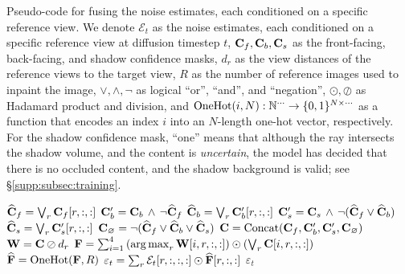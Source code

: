 \begin{algorithm*}
\caption{Pseudo-code for fusing the noise estimates, each conditioned on a specific reference view. We denote $\mathcal{E}_t$ as the noise estimates, each conditioned on a specific reference view at diffusion timestep $t$, $\mathbf{C}_f, \mathbf{C}_b, \mathbf{C}_s$ as the front-facing, back-facing, and shadow confidence masks, $d_r$ as the view distances of the reference views to the target view, $R$ as the number of reference images used to inpaint the image, $\lor, \land, \neg$ as logical ``or'', ``and'', and ``negation'', $\odot, \oslash$ as Hadamard product and division, and $\operatorname{OneHot}(i, N): \mathbb{N}^{\cdots} \to \{0, 1\}^{N \times \cdots}$ as a function that encodes an index $i$ into an $N$-length one-hot vector, respectively. For the shadow confidence mask, ``one'' means that although the ray intersects the shadow volume, and the content is \textit{uncertain}, the model has decided that there is no occluded content, and the shadow background is valid; see \S\ref{supp:subsec:training}. }
\begin{algorithmic}[1]
    \State $\widehat{\mathbf{C}}_f = \bigvee_r \mathbf{C}_f[r, :, :]$
    \State $\mathbf{C}'_b = \mathbf{C}_b \, \land \, \neg \widehat{\mathbf{C}}_f$
    \State $\widehat{\mathbf{C}}_b = \bigvee_r \mathbf{C}'_b[r, :, :]$
    \State $\mathbf{C}'_s = \mathbf{C}_s \, \land \, \neg (\widehat{\mathbf{C}}_f \lor \widehat{\mathbf{C}}_b)$
    \State $\widehat{\mathbf{C}}_s = \bigvee_r \mathbf{C}'_s[r, :, :]$
    \State $\mathbf{C}_\varnothing = \neg (\widehat{\mathbf{C}}_f \lor \widehat{\mathbf{C}}_b \lor \widehat{\mathbf{C}}_s)$
    \State $\mathbf{C} = \operatorname{Concat}(\mathbf{C}_f, \mathbf{C}'_b, \mathbf{C}'_s, \mathbf{C}_\varnothing)$
    \State $\mathbf{W} = \mathbf{C} \oslash d_r$
    \State $\mathbf{F} = \sum_{i=1}^4 \left(
        \operatorname*{arg\,max}_r \mathbf{W}[i, r, :, :]
    \right) \odot \left(
        \bigvee_r \mathbf{C}[i, r, :, :]
    \right)$
    \State $\widehat{\mathbf{F}} = \operatorname{OneHot}(\mathbf{F}, R)$
    \State $\varepsilon_t = \sum_r \mathcal{E}_t[r, :, :, :] \odot \widehat{\mathbf{F}}[r, :, :]$
    \State \Return $\varepsilon_t$
\EndProcedure
\end{algorithmic}
\label{alg:fusion}
\end{algorithm*}

